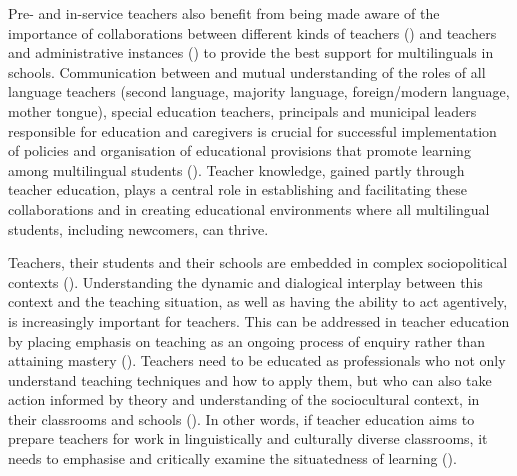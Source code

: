\documentclass[output=paper]{langscibook}
\begin{document}
Pre- and in-service teachers also benefit from being made aware of the importance of collaborations between different kinds of teachers (\citealt{Creese2005,GanuzaHedman2015}) and teachers and administrative instances (\citealt{WedinWessman2017}) to provide the best support for multilinguals in schools. Communication between and mutual understanding of the roles of all language teachers (second language, majority language, foreign/modern language, mother tongue), {s}pecial education teachers, principals and municipal leaders responsible for education and caregivers is crucial for successful implementation of policies and organisation of educational provisions that promote learning among multilingual students (\citealt{Dewilde2013,Warren2017}). Teacher knowledge, gained partly through teacher education, plays a central role in establishing and facilitating these collaborations and in creating educational environments where all multilingual students, including newcomers, can thrive.

Teachers, their students and their schools are embedded in complex sociopolitical contexts (\citealt[289]{Cochran-SmithLytle1999}). Understanding the dynamic and dialogical interplay between this context and the teaching situation, as well as having the ability to act agentively, is increasingly important for teachers. This can be addressed in teacher education by placing emphasis on teaching as an ongoing process of enquiry rather than attaining mastery (\citealt{TooheySmythe2022}). Teachers need to be educated as professionals who not only understand teaching techniques and how to apply them, but who can also take action informed by theory and understanding of the sociocultural context, in their classrooms and schools (\citealt{Leung2022,VillegasEtAl2018}). In other words, if teacher education aims to prepare teachers for work in linguistically and culturally diverse classrooms, it needs to emphasise and critically examine the situatedness of learning (\citealt{Liddicoat2022,OjhaEtAl2024}).
\end{document}
